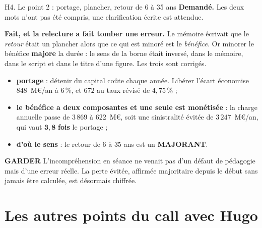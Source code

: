 \documentclass[11pt]{beamer}
\newcommand{\garder}{\textbf{GARDER}}
\newcommand{\srcs}[1]{\vspace{0.8mm}{\tiny\textcolor{gray!50!black}{Sources : #1}}}
\begin{document}
\begin{frame}{H4. Le point 2 : portage, plancher, retour de 6 à 35 ans}
\scriptsize
\textbf{Demandé.} Les deux mots n'ont pas été compris, une clarification écrite est attendue.
\vspace{1mm}

\textbf{Fait, et la relecture a fait tomber une erreur.} Le mémoire écrivait que le
\emph{retour} était un \og plancher \fg{} alors que ce qui est minoré est le \emph{bénéfice}.
Or minorer le bénéfice \textbf{majore} la durée : le sens de la borne était inversé, dans le
mémoire, dans le script et dans le titre d'une figure. Les trois sont corrigés.
\begin{itemize}\itemsep1pt
\item \textbf{portage} : détenir du capital coûte chaque année. Libérer l'écart économise
$848$~M\euro/an à $6\,\%$, et $672$ au taux révisé de $4{,}75\,\%$ ;
\item \textbf{le bénéfice a deux composantes et une seule est monétisée} : la charge annuelle
passe de $3\,869$ à $622$~M\euro, soit une sinistralité évitée de $3\,247$~M\euro/an, qui vaut
$\mathbf{3{,}8}$ \textbf{fois} le portage ;
\item \textbf{d'où le sens} : le retour de $6$ à $35$ ans est un \textbf{MAJORANT}.
\end{itemize}
\begin{block}{\garder}
L'incompréhension en séance ne venait pas d'un défaut de pédagogie mais d'une erreur réelle. La
perte évitée, affirmée \og majoritaire \fg{} depuis le début sans jamais être calculée, est
désormais chiffrée.
\end{block}
\srcs{script~\texttt{50}}
\end{frame}

\section*{Les autres points du call avec Hugo}
\end{document}
